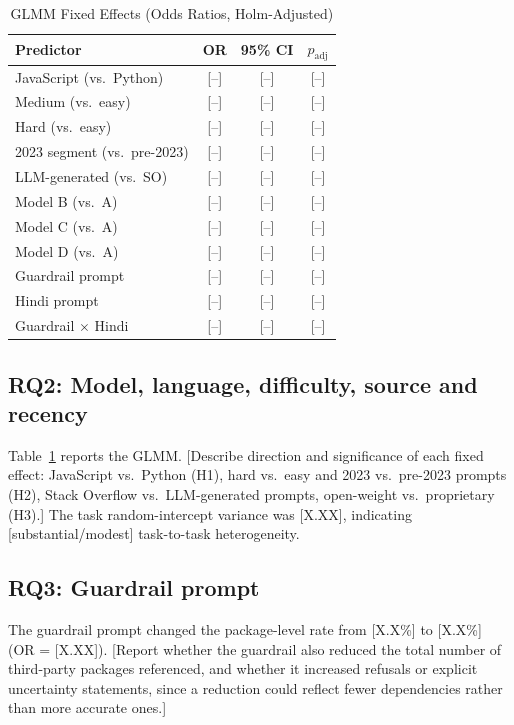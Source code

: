 \documentclass[conference]{IEEEtran}
\begin{document}
\begin{table}[t]
\caption{GLMM Fixed Effects (Odds Ratios, Holm-Adjusted)}
\label{tab:glmm}
\centering
\begin{tabular}{@{}lccc@{}}
\toprule
Predictor & OR & 95\% CI & $p_{\text{adj}}$ \\
\midrule
JavaScript (vs.\ Python)       & [--] & [--] & [--] \\
Medium (vs.\ easy)             & [--] & [--] & [--] \\
Hard (vs.\ easy)               & [--] & [--] & [--] \\
2023 segment (vs.\ pre-2023)   & [--] & [--] & [--] \\
LLM-generated (vs.\ SO)        & [--] & [--] & [--] \\
Model B (vs.\ A)               & [--] & [--] & [--] \\
Model C (vs.\ A)               & [--] & [--] & [--] \\
Model D (vs.\ A)               & [--] & [--] & [--] \\
Guardrail prompt               & [--] & [--] & [--] \\
Hindi prompt                   & [--] & [--] & [--] \\
Guardrail $\times$ Hindi       & [--] & [--] & [--] \\
\bottomrule
\end{tabular}
\end{table}

\subsection{RQ2: Model, language, difficulty, source and recency}
Table~\ref{tab:glmm} reports the GLMM. [Describe direction and significance of each fixed effect: JavaScript vs.\ Python (H1), hard vs.\ easy and 2023 vs.\ pre-2023 prompts (H2), Stack Overflow vs.\ LLM-generated prompts, open-weight vs.\ proprietary (H3).] The task random-intercept variance was [X.XX], indicating [substantial/modest] task-to-task heterogeneity.

\subsection{RQ3: Guardrail prompt}
The guardrail prompt changed the package-level rate from [X.X\%] to [X.X\%] (OR = [X.XX]). [Report whether the guardrail also reduced the total number of third-party packages referenced, and whether it increased refusals or explicit uncertainty statements, since a reduction could reflect fewer dependencies rather than more accurate ones.]
\end{document}
